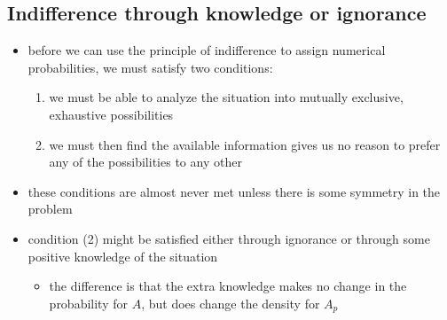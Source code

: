 \documentclass[../jaynes_prob_theory_notes.tex]{subfiles}
\begin{document}
            \subsection{Indifference through knowledge or ignorance}
                \begin{itemize} 
                    \item before we can use the principle of indifference to assign numerical probabilities, we must satisfy two conditions:
                        \begin{enumerate}
                            \item we must be able to analyze the situation into mutually exclusive, exhaustive possibilities
                            \item we must then find the available information gives us no reason to prefer any of the possibilities to any other
                        \end{enumerate}
                    \item these conditions are almost never met unless there is some symmetry in the problem
                    \item condition (2) might be satisfied either through ignorance or through some positive knowledge of the situation
                        \begin{itemize} 
                            \item the difference is that the extra knowledge makes no change in the probability for \(A\), but does change the density for \(A_p\)
                        \end{itemize}
                \end{itemize}
\end{document}
